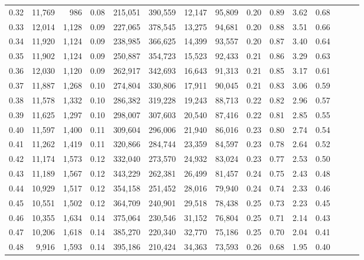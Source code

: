 \begin{tabular}{rrrrrrrrrrrrrrr}
0.32 &  11,769 &    986 &  0.08 &  215,051 &  390,559 &   12,147 &   95,809 &  0.20 &  0.89 &  3.62 &      0.68 \\
0.33 &  12,014 &  1,128 &  0.09 &  227,065 &  378,545 &   13,275 &   94,681 &  0.20 &  0.88 &  3.51 &      0.66 \\
0.34 &  11,920 &  1,124 &  0.09 &  238,985 &  366,625 &   14,399 &   93,557 &  0.20 &  0.87 &  3.40 &      0.64 \\
0.35 &  11,902 &  1,124 &  0.09 &  250,887 &  354,723 &   15,523 &   92,433 &  0.21 &  0.86 &  3.29 &      0.63 \\
0.36 &  12,030 &  1,120 &  0.09 &  262,917 &  342,693 &   16,643 &   91,313 &  0.21 &  0.85 &  3.17 &      0.61 \\
0.37 &  11,887 &  1,268 &  0.10 &  274,804 &  330,806 &   17,911 &   90,045 &  0.21 &  0.83 &  3.06 &      0.59 \\
0.38 &  11,578 &  1,332 &  0.10 &  286,382 &  319,228 &   19,243 &   88,713 &  0.22 &  0.82 &  2.96 &      0.57 \\
0.39 &  11,625 &  1,297 &  0.10 &  298,007 &  307,603 &   20,540 &   87,416 &  0.22 &  0.81 &  2.85 &      0.55 \\
0.40 &  11,597 &  1,400 &  0.11 &  309,604 &  296,006 &   21,940 &   86,016 &  0.23 &  0.80 &  2.74 &      0.54 \\
0.41 &  11,262 &  1,419 &  0.11 &  320,866 &  284,744 &   23,359 &   84,597 &  0.23 &  0.78 &  2.64 &      0.52 \\
0.42 &  11,174 &  1,573 &  0.12 &  332,040 &  273,570 &   24,932 &   83,024 &  0.23 &  0.77 &  2.53 &      0.50 \\
0.43 &  11,189 &  1,567 &  0.12 &  343,229 &  262,381 &   26,499 &   81,457 &  0.24 &  0.75 &  2.43 &      0.48 \\
0.44 &  10,929 &  1,517 &  0.12 &  354,158 &  251,452 &   28,016 &   79,940 &  0.24 &  0.74 &  2.33 &      0.46 \\
0.45 &  10,551 &  1,502 &  0.12 &  364,709 &  240,901 &   29,518 &   78,438 &  0.25 &  0.73 &  2.23 &      0.45 \\
0.46 &  10,355 &  1,634 &  0.14 &  375,064 &  230,546 &   31,152 &   76,804 &  0.25 &  0.71 &  2.14 &      0.43 \\
0.47 &  10,206 &  1,618 &  0.14 &  385,270 &  220,340 &   32,770 &   75,186 &  0.25 &  0.70 &  2.04 &      0.41 \\
0.48 &   9,916 &  1,593 &  0.14 &  395,186 &  210,424 &   34,363 &   73,593 &  0.26 &  0.68 &  1.95 &      0.40 \\

\end{tabular}
